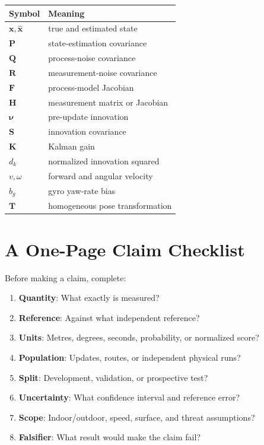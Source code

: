 \documentclass[11pt,oneside]{book}
\newcommand{\vect}[1]{\bm{#1}}
\begin{document}
\begin{longtable}{p{}p{}}
\toprule
Symbol & Meaning\\
\midrule
\endhead
$\vect{x},\hat{\vect{x}}$ & true and estimated state\\
$\vect{P}$ & state-estimation covariance\\
$\vect{Q}$ & process-noise covariance\\
$\vect{R}$ & measurement-noise covariance\\
$\vect{F}$ & process-model Jacobian\\
$\vect{H}$ & measurement matrix or Jacobian\\
$\vect{\nu}$ & pre-update innovation\\
$\vect{S}$ & innovation covariance\\
$\vect{K}$ & Kalman gain\\
$d_k$ & normalized innovation squared\\
$v,\omega$ & forward and angular velocity\\
$b_g$ & gyro yaw-rate bias\\
$\vect{T}$ & homogeneous pose transformation\\
\bottomrule
\end{longtable}

\chapter{A One-Page Claim Checklist}

Before making a claim, complete:
\begin{enumerate}
  \item \textbf{Quantity}: What exactly is measured?
  \item \textbf{Reference}: Against what independent reference?
  \item \textbf{Units}: Metres, degrees, seconds, probability, or normalized
  score?
  \item \textbf{Population}: Updates, routes, or independent physical runs?
  \item \textbf{Split}: Development, validation, or prospective test?
  \item \textbf{Uncertainty}: What confidence interval and reference error?
  \item \textbf{Scope}: Indoor/outdoor, speed, surface, and threat assumptions?
  \item \textbf{Falsifier}: What result would make the claim fail?
\end{enumerate}
\end{document}

